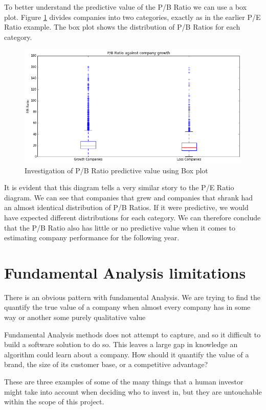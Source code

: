 \documentclass{report}
\begin{document}
To better understand the predictive value of the P/B Ratio we can use a box plot. Figure \ref{fig:pb-box} divides companies into two categories, exactly as in the earlier P/E Ratio example. The box plot shows the distribution of P/B Ratios for each category.

\begin{figure}[H]
	\caption{Investigation of P/B Ratio predictive value using Box plot}
	\centerline{\includegraphics[width=\textwidth]{vis/pb_box.png}}
	\label{fig:pb-box}
\end{figure}

It is evident that this diagram tells a very similar story to the P/E Ratio diagram. We can see that companies that grew and companies that shrank had an almost identical distribution of P/B Ratios. If it were predictive, we would have expected different distributions for each category. We can therefore conclude that the P/B Ratio also has little or no predictive value when it comes to estimating company performance for the following year.

\section{Fundamental Analysis limitations}

There is an obvious pattern with fundamental Analysis. We are trying to find the quantify the true value of a company when almost every company has in some way or another some purely qualitative value

Fundamental Analysis methods does not attempt to capture, and so it difficult to build a software solution to do so. This leaves a large gap in knowledge an algorithm could learn about a company. How should it quantify the value of a brand, the size of its customer base, or a competitive advantage?

These are three examples of some of the many things that a human investor might take into account when deciding who to invest in, but they are untouchable within the scope of this project. 
\end{document}

